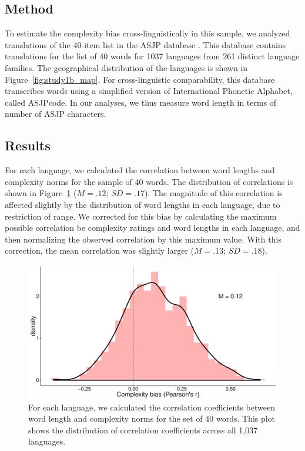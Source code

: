 \subsection{Method}
To estimate the complexity bias cross-linguistically in this sample, we analyzed translations of the 40-item list in the  ASJP database \cite{asjp}. This database contains translations for the list of 40 words for 1037 languages from 261 distinct language families. The geographical distribution of the languages is shown in Figure\ \ref{fig:study1b_map}. For cross-linguistic comparability, this database transcribes words using a simplified version of International Phonetic Alphabet, called ASJPcode. In our analyses, we thus measure word length in terms of number of ASJP characters.

\subsection{Results}
For each language, we calculated the correlation between word lengths and complexity norms for the sample of 40 words. The distribution of correlations is shown in  
Figure\ \ref{fig:study1b} ($M = .12$; $SD = .17$). The magnitude of this correlation is affected slightly by the distribution of word lengths in each language, due to restriction of range. We corrected for this bias by calculating the maximum possible correlation be complexity ratings and word lengths in each language, and then normalizing the observed correlation by this maximum value. With this correction, the mean correlation was slightly larger ($M = .13$; $SD = .18$). 

\begin{figure}[t!]
\begin{center}
\includegraphics[scale = .35]{figs/chap4_1b.pdf}
\end{center}
\caption{For each language, we calculated the correlation coefficients between word length and complexity norms for the set of 40 words. This plot shows the distribution of correlation coefficients across all 1,037 languages. }
\label{fig:study1b}
\end{figure}


